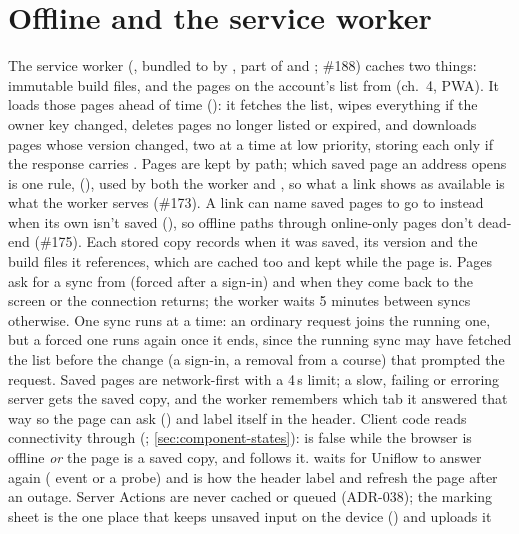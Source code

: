 \section{Offline and the service worker}\label{sec:offline}
The service worker (, bundled to  by , part of  and ; \#188) caches two things: immutable build files, and the pages
on the account's list from  (ch.~4, PWA). It loads those pages ahead of
time (): it fetches the list, wipes everything if the owner key changed, deletes
pages no longer listed or expired, and downloads pages whose version changed, two at a time at
low priority, storing each only if the response carries . Pages are kept by path; which saved page an address opens is one rule, 
(), used by both the worker and , so what a link shows
as available is what the worker serves (\#173). A link can name saved pages to go to instead when its own isn't saved (), so offline paths through online-only pages don't dead-end (\#175). Each
stored copy records when it was saved, its version and the build files it references, which are
cached too and kept while the page is. Pages ask for a sync from  (forced after
a sign-in) and when they come back to the screen or the connection returns; the worker waits
5 minutes between syncs otherwise. One sync runs at a time: an ordinary request joins the running
one, but a forced one runs again once it ends, since the running sync may have fetched the list
before the change (a sign-in, a removal from a course) that prompted the request. Saved pages are network-first with a 4\,s limit; a slow, failing or
erroring server gets the saved copy, and the worker remembers which tab it answered that way so
the page can ask () and label itself in the header. Client code reads connectivity
through  (; \cref{sec:component-states}):
 is false while the browser is offline \emph{or} the page is a saved copy, and
 follows it.
 waits for Uniflow to answer again ( event or a
 probe) and is how the header label and  refresh the page after
an outage. Server Actions are never cached or queued (ADR-038); the marking sheet is the one
place that keeps unsaved input on the device () and uploads it
